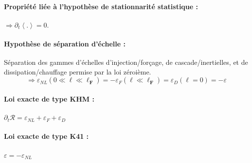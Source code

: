 {\begin{minipage}[c]{\linewidth}
 \paragraph{Propriété liée à l'hypothèse de stationnarité statistique : } $\Rightarrow \partial_t \left<.\right> = 0$.
 
 \paragraph{Hypothèse de séparation d'échelle : } Séparation des gammes d'échelles d'injection/forçage, de cascade/inertielles, et de dissipation/chauffage permise par la loi zéroième.
 \begin{equation*}
 \Rightarrow  \varepsilon_{NL}(0 \ll \boldsymbol{\ell} \ll \boldsymbol{\ell_F} ) = - \varepsilon_{F}(\boldsymbol{\ell} \ll \boldsymbol{\ell_F} ) = \varepsilon_{D}(\boldsymbol{\ell}=0) = - \varepsilon
 \end{equation*}
 
 \paragraph{Loi exacte de type KHM : } $\partial_t \mathcal{R} = \varepsilon_{NL} + \varepsilon_{F} + \varepsilon_{D}$
 
 \paragraph{Loi exacte de type K41 : } $\varepsilon = -\varepsilon_{NL}$
\end{minipage}}
